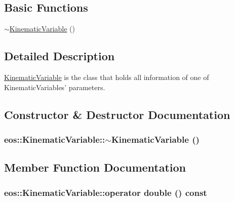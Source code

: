\subsection*{Basic Functions}
\label{_amgrp2386c9a1f1785edee33f374dd2db9b3d}
 \begin{DoxyCompactItemize}
\item 
\hyperlink{classeos_1_1KinematicVariable_a68475baffe3d46d4feeb89b94bd355e6}{$\sim$KinematicVariable} ()
\end{DoxyCompactItemize}


\subsection{Detailed Description}
\hyperlink{classeos_1_1KinematicVariable}{KinematicVariable} is the class that holds all information of one of KinematicVariables' parameters. 

\subsection{Constructor \& Destructor Documentation}
\hypertarget{classeos_1_1KinematicVariable_a68475baffe3d46d4feeb89b94bd355e6}{
\subsubsection[{$\sim$KinematicVariable}]{\setlength{\rightskip}{0pt plus 5cm}eos::KinematicVariable::$\sim$KinematicVariable ()}}
\label{classeos_1_1KinematicVariable_a68475baffe3d46d4feeb89b94bd355e6}


\subsection{Member Function Documentation}
\hypertarget{classeos_1_1KinematicVariable_ae7397422b2e7c59c1bd8757705463839}{
\subsubsection[{operator double}]{\setlength{\rightskip}{0pt plus 5cm}eos::KinematicVariable::operator double () const}}
\label{classeos_1_1KinematicVariable_ae7397422b2e7c59c1bd8757705463839}


